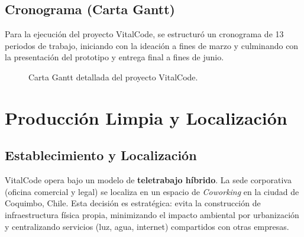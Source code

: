 \documentclass[12pt,letterpaper]{article}
\begin{document}
\subsection{Cronograma (Carta Gantt)}
Para la ejecución del proyecto VitalCode, se estructuró un cronograma de 13 periodos de trabajo, iniciando con la ideación a fines de marzo y culminando con la presentación del prototipo y entrega final a fines de junio.

\begin{figure}[H]
\centering
{}
\caption{Carta Gantt detallada del proyecto VitalCode.}
\end{figure}

\section{Producción Limpia y Localización}

\subsection{Establecimiento y Localización}
VitalCode opera bajo un modelo de \textbf{teletrabajo híbrido}. La sede corporativa (oficina comercial y legal) se localiza en un espacio de \textit{Coworking} en la ciudad de Coquimbo, Chile. Esta decisión es estratégica: evita la construcción de infraestructura física propia, minimizando el impacto ambiental por urbanización y centralizando servicios (luz, agua, internet) compartidos con otras empresas.
\end{document}

